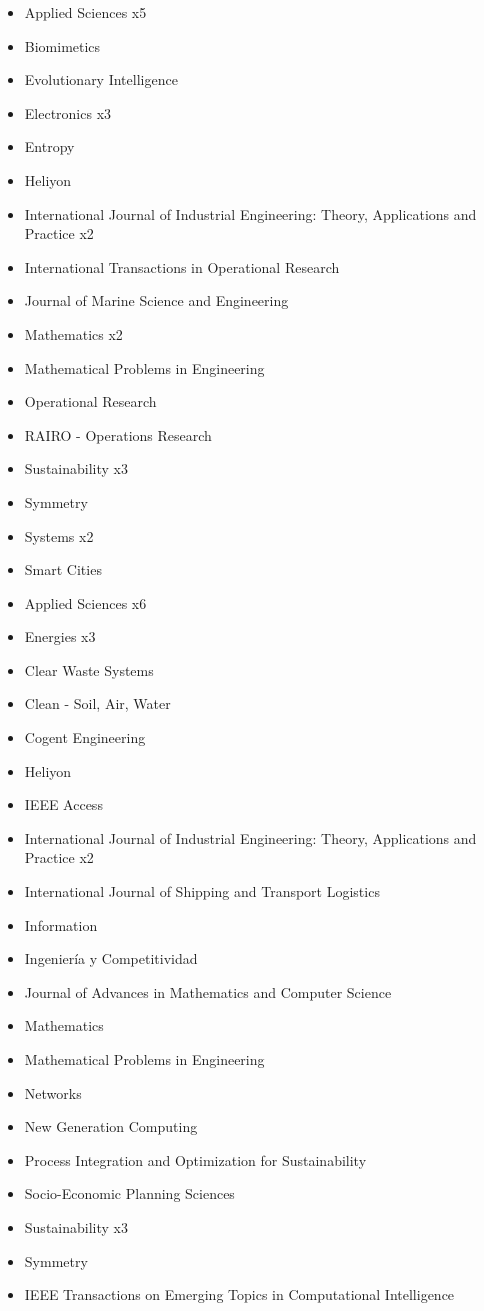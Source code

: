 {\begin{itemize}
\item Applied Sciences x5
\item Biomimetics
\item Evolutionary Intelligence
\item Electronics x3
\item Entropy
\item Heliyon
\item International Journal of Industrial Engineering: Theory, Applications and Practice x2
\item International Transactions in Operational Research
\item Journal of Marine Science and Engineering
\item Mathematics x2
\item Mathematical Problems in Engineering
\item Operational Research
\item RAIRO - Operations Research
\item Sustainability x3
\item Symmetry
\item Systems x2
\item Smart Cities
\end{itemize}
}

{\begin{itemize}
\item Applied Sciences x6
\item Energies x3
\item Clear Waste Systems
\item Clean - Soil, Air, Water
\item Cogent Engineering
\item Heliyon
\item IEEE Access
\item International Journal of Industrial Engineering: Theory, Applications and Practice x2
\item International Journal of Shipping and Transport Logistics
\item Information
\item Ingenier\'ia y Competitividad
\item Journal of Advances in Mathematics and Computer Science
\item Mathematics
\item Mathematical Problems in Engineering
\item Networks
\item New Generation Computing
\item Process Integration and Optimization for Sustainability
\item Socio-Economic Planning Sciences
\item Sustainability x3
\item Symmetry
\item IEEE Transactions on Emerging Topics in Computational Intelligence 
\end{itemize}
}

